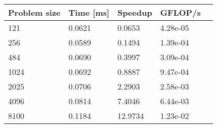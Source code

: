 \begin{tabular}{l|l|l|l|l}
Problem size & Time [ms] & Speedup & GFLOP/s \\ \hline
       121 & 0.0621 & 0.0653 & 4.28e-05\\
       256 & 0.0589 & 0.1494 & 1.39e-04\\
       484 & 0.0690 & 0.3997 & 3.09e-04\\
      1024 & 0.0692 & 0.8887 & 9.47e-04\\
      2025 & 0.0706 & 2.2903 & 2.58e-03\\
      4096 & 0.0814 & 7.4046 & 6.44e-03\\
      8100 & 0.1184 & 12.9734 & 1.23e-02\\
\end{tabular}